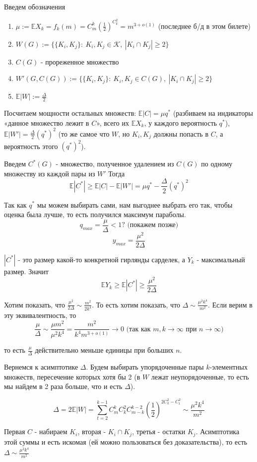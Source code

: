 \par Введем обозначения
\begin{enumerate}
    \item $\mu:=\mathbb{E}X_k=f_k(m)=C_m^k \left(\frac{1}{2}\right)^{C_k^2}=m^{3+o(1)}$ (последнее б/д в этом билете)
    \item $W(G):=\{\{K_i, K_j\}: \: K_i, K_j \in \mathcal{K}, \: |K_i \cap K_j| \geq 2\}$
    \item $C(G)$ - прореженное множество
    \item $W'(G, C(G)):=\{\{K_i, K_j\}: \: K_i, K_j \in C(G), \: |K_i \cap K_j| \geq 2\}$
    \item $\mathbb{E}|W|:=\frac{\Delta}{2}$
\end{enumerate}

\par Посчитаем мощности остальных множеств: $\mathbb{E}|C|=\mu q^*$ (разбиваем на индикаторы «данное множество лежит в $C$», всего их $\mathbb{E}X_k$, у каждого вероятность $q^*$), $\mathbb{E}|W'|=\frac{\Delta}{2}(q^*)^2$ (то же самое что $W$, но $K_i, K_j$ должны попасть в $C$, а вероятность этого $(q^*)^2$).

\par Введем $C^*(G)$ - множество, полученное удалением из $C(G)$ по одному множеству из каждой пары из $W'$ Тогда
$$\mathbb{E}|C^*| \geq \mathbb{E}|C|-\mathbb{E}|W'|=\mu q^*-\frac{\Delta}{2} (q^*)^2$$

\par Так как $q^*$ мы можем выбирать сами, нам выгоднее выбрать его так, чтобы оценка была лучше, то есть получился максимум параболы. $$q_{max}=\frac{\mu}{\Delta}<1? \text{ (покажем позже)}$$
$$y_{max}=\frac{\mu^2}{2\Delta}$$

\par $|C^*|$ - это размер какой-то конкретной гирлянды сарделек, а $Y_k$ - максимальный размер. Значит $$\mathbb{E}Y_k \geq \mathbb{E}|C^*|\geq \frac{\mu^2}{2\Delta}$$

\par Хотим показать, что $\frac{\mu^2}{2\Delta} \sim \frac{m^2}{2k^4}$. То есть хотим показать, что $\Delta \sim \frac{\mu^2 k^4}{m^2}$. Если верим в эту эквивалентность, то
$$\frac{\mu}{\Delta}\sim \frac{\mu m^2}{\mu^2 k^4}=\frac{m^2}{k^4 m^{3+o(1)}} \rightarrow 0 \text{ (так как $m, k\rightarrow \infty$ при $n\rightarrow \infty$)}$$
\par то есть $\frac{\mu}{\Delta}$ действительно меньше единицы при больших $n$.

\par Вернемся к асимптотике $\Delta$. Будем выбирать упорядоченные пары $k$-элементных множеств, пересечение которых хотя бы 2 (в $W$ лежат неупорядоченные, то есть мы найдем в 2 раза больше, что и есть $\Delta$).

$$\Delta=2\mathbb{E}|W|=\sum_{t=2}^{k-1} C_m^k C_k^2 C_{m-k}^{k-2} \left(\frac{1}{2}\right)^{2C_k^2 - C_t^2}\sim \frac{\mu^2 k^4}{m^2}$$

\par Первая $C$ - набираем $K_i$, вторая - $K_i \cap K_j$, третья - остатки $K_j$. Асимптотика этой суммы и есть искомая (ей можно пользоваться без доказательства), то есть $\Delta \sim \frac{\mu^2 k^4}{m^2}$ \EndProof
